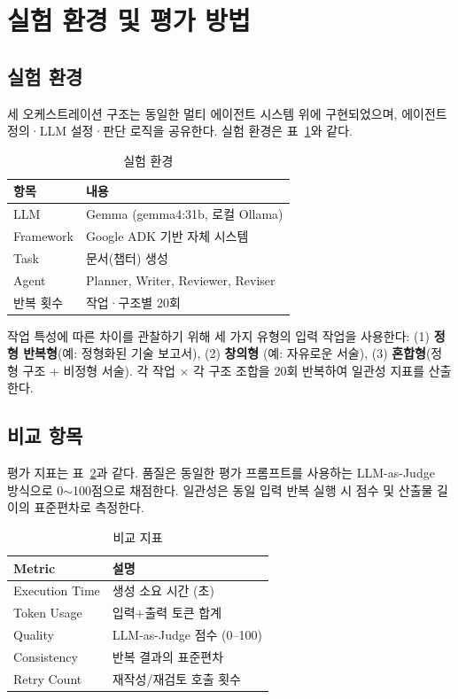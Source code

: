 \section{실험 환경 및 평가 방법}

\subsection{실험 환경}

세 오케스트레이션 구조는 동일한 멀티 에이전트 시스템 위에 구현되었으며,
에이전트 정의·LLM 설정·판단 로직을 공유한다. 실험 환경은
표~\ref{tab:env}와 같다.

\begin{table}[t]
\centering
\caption{실험 환경}
\label{tab:env}
\begin{tabular}{ll}
\toprule
\textbf{항목} & \textbf{내용} \\
\midrule
LLM        & Gemma (gemma4:31b, 로컬 Ollama) \\
Framework  & Google ADK 기반 자체 시스템 \\
Task       & 문서(챕터) 생성 \\
Agent      & Planner, Writer, Reviewer, Reviser \\
반복 횟수  & 작업·구조별 20회 \\
\bottomrule
\end{tabular}
\end{table}

작업 특성에 따른 차이를 관찰하기 위해 세 가지 유형의 입력 작업을 사용한다:
(1) \textbf{정형 반복형}(예: 정형화된 기술 보고서), (2) \textbf{창의형}
(예: 자유로운 서술), (3) \textbf{혼합형}(정형 구조 + 비정형 서술). 각
작업 $\times$ 각 구조 조합을 20회 반복하여 일관성 지표를 산출한다.

\subsection{비교 항목}

평가 지표는 표~\ref{tab:metric}과 같다. 품질은 동일한 평가 프롬프트를
사용하는 LLM-as-Judge~\cite{zheng2023judge} 방식으로 0$\sim$100점으로
채점한다. 일관성은 동일 입력 반복 실행 시 점수 및 산출물 길이의 표준편차로
측정한다.

\begin{table}[t]
\centering
\caption{비교 지표}
\label{tab:metric}
\begin{tabular}{ll}
\toprule
\textbf{Metric} & \textbf{설명} \\
\midrule
Execution Time & 생성 소요 시간 (초) \\
Token Usage    & 입력+출력 토큰 합계 \\
Quality        & LLM-as-Judge 점수 (0--100) \\
Consistency    & 반복 결과의 표준편차 \\
Retry Count    & 재작성/재검토 호출 횟수 \\
\bottomrule
\end{tabular}
\end{table}
